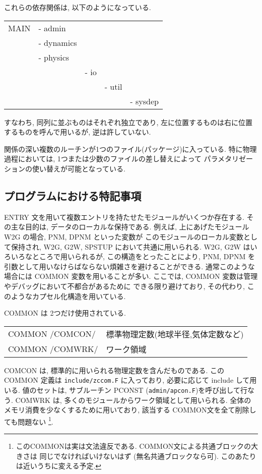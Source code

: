 \・これらの依存関係は, 以下のようになっている. 
\begin{center}
\begin{tabular}{lllll}
MAIN & - admin     & \\
     & - dynamics  & \\
     & - physics   & \\
     &             & - io   & \\
     &             &        & - util & \\
     &             &        &        & - sysdep \\
\end{tabular}
\end{center}
すなわち, 同列に並ぶものはそれぞれ独立であり,
左に位置するものは右に位置するものを呼んで用いるが, 逆は許していない.

\・関係の深い複数のルーチンが1つのファイル(パッケージ)に入っている.
特に物理過程においては, 1つまたは少数のファイルの差し替えによって
パラメタリゼーションの使い替えが可能となっている.

\subsection{プログラムにおける特記事項}

\・ENTRY 文を用いて複数エントリを持たせたモジュールがいくつか存在する.
その主な目的は, データのローカルな保持である.
例えば, 上にあげたモジュール W2G の場合, PNM, DPNM といった変数が
このモジュールのローカル変数として保持され,
W2G, G2W, SPSTUP において共通に用いられる.
W2G, G2W はいろいろなところで用いられるが, この構造をとったことにより,
PNM, DPNM を引数として用いなけらばならない煩雑さを避けることができる.
通常このような場合には COMMON 変数を用いることが多い.
ここでは, COMMON 変数は管理やデバッグにおいて不都合があるために
できる限り避けており, その代わり, このようなカプセル化構造を用いている.

\・COMMON は 2つだけ使用されている.
\begin{center}
  \begin{tabular}{ll}
    COMMON /COMCON/  & 標準物理定数(地球半径,気体定数など) \\
    COMMON /COMWRK/  & ワーク領域 \\
  \end{tabular}
\end{center}
COMCON は, 標準的に用いられる物理定数を含んだものである.
この COMMON 定義は {\tt include/zccom.F} に入っており,
必要に応じて include して用いる. 
値のセットは,  サブルーチン PCONST ({\tt admin/apcon.F})を呼び出して行なう.
%
COMWRK は, 多くのモジュールからワーク領域として用いられる.
全体のメモリ消費を少なくするために用いており, 
該当する COMMON文を全て削除しても問題ない 
\footnote{このCOMMONは実は文法違反である. 
          COMMON文による共通ブロックの大きさは
          同じでなければいけないはず
          (無名共通ブロックなら可).
          このあたりは近いうちに変える予定.}.

